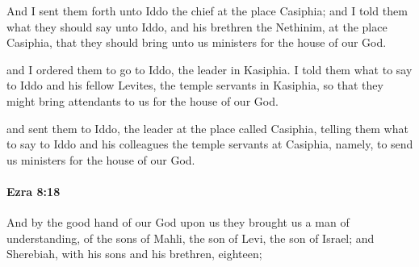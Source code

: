 			\begin{versebox}
					\item[BHS] 
					\item[LXX] 
					\item[ASV] And I sent them forth unto Iddo the chief at the place Casiphia; and I told them what they should say unto Iddo, and his brethren the Nethinim, at the place Casiphia, that they should bring unto us ministers for the house of our God.
					\item[NIV] and I ordered them to go to Iddo, the leader in Kasiphia. I told them what to say to Iddo and his fellow Levites, the temple servants in Kasiphia, so that they might bring attendants to us for the house of our God.
					\item[NRSV] and sent them to Iddo, the leader at the place called Casiphia, telling them what to say to Iddo and his colleagues the temple servants at Casiphia, namely, to send us ministers for the house of our God.
			\end{versebox}

		\paragraph{Ezra 8:18} %
			\label{EZRA-8-18}

			And by the good hand of our God upon us they brought us a man of understanding, of the sons of Mahli, the son of Levi, the son of Israel; and Sherebiah, with his sons and his brethren, eighteen;

